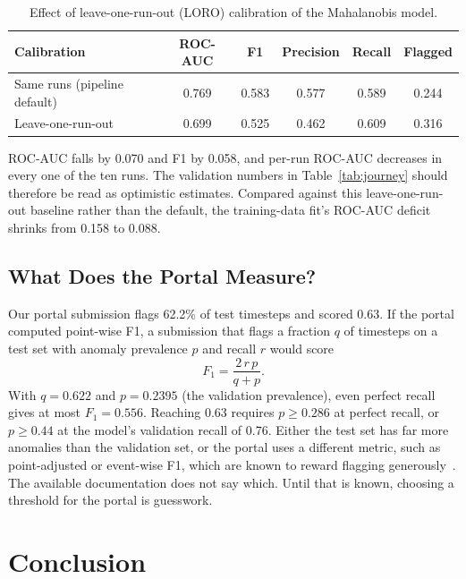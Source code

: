 \documentclass[runningheads]{llncs}
\begin{document}
\begin{table}[t]
\centering
\caption{Effect of leave-one-run-out (LORO) calibration of the Mahalanobis model.}\label{tab:loro}
\begin{tabular}{lccccc}
\toprule
Calibration & ROC-AUC & F1 & Precision & Recall & Flagged \\
\midrule
Same runs (pipeline default) & 0.769 & 0.583 & 0.577 & 0.589 & 0.244 \\
Leave-one-run-out & 0.699 & 0.525 & 0.462 & 0.609 & 0.316 \\
\bottomrule
\end{tabular}
\end{table}

ROC-AUC falls by 0.070 and F1 by 0.058, and per-run ROC-AUC decreases in every one of the ten runs. The validation numbers in Table~\ref{tab:journey} should therefore be read as optimistic estimates. Compared against this leave-one-run-out baseline rather than the default, the training-data fit's ROC-AUC deficit shrinks from 0.158 to 0.088.

\subsection{What Does the Portal Measure?}

Our portal submission flags 62.2\% of test timesteps and scored 0.63. If the portal computed point-wise F1, a submission that flags a fraction $q$ of timesteps on a test set with anomaly prevalence $p$ and recall $r$ would score
\begin{equation}
  F_1 = \frac{2\,r\,p}{q + p}.
\end{equation}
With $q = 0.622$ and $p = 0.2395$ (the validation prevalence), even perfect recall gives at most $F_1 = 0.556$. Reaching 0.63 requires $p \geq 0.286$ at perfect recall, or $p \geq 0.44$ at the model's validation recall of 0.76. Either the test set has far more anomalies than the validation set, or the portal uses a different metric, such as point-adjusted or event-wise F1, which are known to reward flagging generously~\cite{kim2022towards}. The available documentation does not say which. Until that is known, choosing a threshold for the portal is guesswork.

\section{Conclusion}
\end{document}
